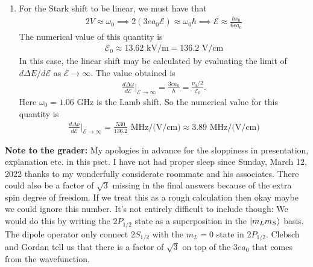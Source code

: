 \documentclass{article}
\theoremstyle{definition}
\newcommand{\f}[2]{\frac{#1}{#2}}
\begin{document}
\begin{enumerate}[label=(\alph*)]
	\item For the Stark shift to be linear, we must have that 
	\begin{align*}
	2V\approx \omega_0 \implies 2(3ea_0 \mathcal{E}) \approx \omega_0 \hbar \implies {\mathcal{E} \approx  \f{h\nu_0}{6ea_0}}
	\end{align*}
	The numerical value of this quantity is 
	\begin{align*}
	\mathcal{E}_0 \approx 13.62 \text{ kV/m} = \boxed{136.2 \text{ V/cm}}
	\end{align*}
	In this case, the linear shift may be calculated by evaluating the limit of $d\Delta E/d\mathcal{E}$ as $\mathcal{E} \to \infty$. The value obtained is 
	\begin{align*}
	\f{d\Delta \omega}{d\mathcal{E}}\bigg\vert_{\mathcal{E}\to \infty} = \f{3 e a_0}{h} =\f{\nu_0/2}{\mathcal{E}_0}.
	\end{align*}
	Here $\omega_0 = 1.06 \text{ GHz}$ is the Lamb shift. So the numerical value for this quantity is 
	\begin{align*}
	\f{d\Delta \nu}{d\mathcal{E}}\bigg\vert_{\mathcal{E}\to \infty} = \f{530}{136.2} \text{ MHz/(V/cm)} \approx \boxed{ 3.89 \text{ MHz/(V/cm)} }
	\end{align*}
	
	
	
\end{enumerate}

\noindent \textbf{Note to the grader:}  My apologies in advance for the sloppiness in presentation, explanation etc. in this pset. I have not had proper sleep since Sunday, March 12, 2022 thanks to my wonderfully considerate roommate and his associates.  There could also be a factor of $\sqrt{3}$ missing in the final answers because of the extra spin degree of freedom. If we treat this as a rough calculation then okay maybe we could ignore  this number. It's not entirely difficult to include though: We would do this by writing the $2P_{1/2}$ state as a superposition in the $\ket{m_Lm_S}$ basis. The dipole operator only connect $2S_{1/2}$ with the $m_L =0$ state in $2P_{1/2}$. Clebsch and Gordan tell us that there is a factor of $\sqrt{3}$ on top of the $3ea_0$ that comes from the wavefunction.  
\end{document}
